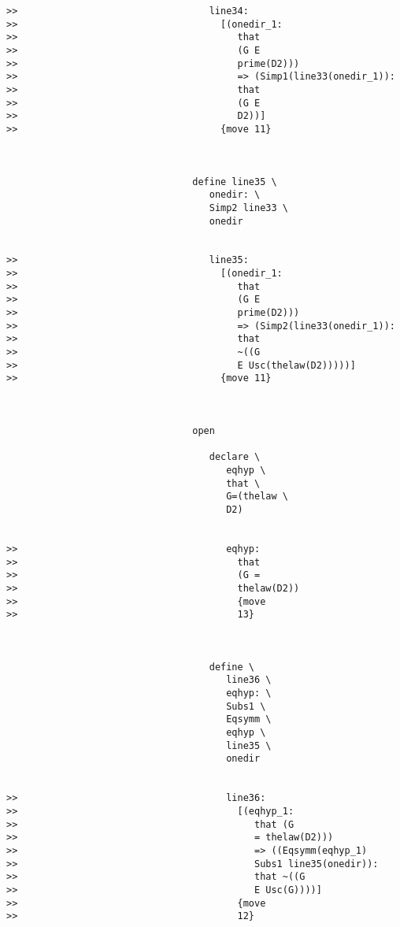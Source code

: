 \documentclass[12pt]{article}
\begin{document}
\begin{verbatim}
>>                                  line34:
>>                                    [(onedir_1:
>>                                       that
>>                                       (G E
>>                                       prime(D2)))
>>                                       => (Simp1(line33(onedir_1)):
>>                                       that
>>                                       (G E
>>                                       D2))]
>>                                    {move 11}



                                 define line35 \
                                    onedir: \
                                    Simp2 line33 \
                                    onedir


>>                                  line35:
>>                                    [(onedir_1:
>>                                       that
>>                                       (G E
>>                                       prime(D2)))
>>                                       => (Simp2(line33(onedir_1)):
>>                                       that
>>                                       ~((G
>>                                       E Usc(thelaw(D2)))))]
>>                                    {move 11}



                                 open

                                    declare \
                                       eqhyp \
                                       that \
                                       G=(thelaw \
                                       D2)


>>                                     eqhyp:
>>                                       that
>>                                       (G =
>>                                       thelaw(D2))
>>                                       {move
>>                                       13}



                                    define \
                                       line36 \
                                       eqhyp: \
                                       Subs1 \
                                       Eqsymm \
                                       eqhyp \
                                       line35 \
                                       onedir


>>                                     line36:
>>                                       [(eqhyp_1:
>>                                          that (G
>>                                          = thelaw(D2)))
>>                                          => ((Eqsymm(eqhyp_1)
>>                                          Subs1 line35(onedir)):
>>                                          that ~((G
>>                                          E Usc(G))))]
>>                                       {move
>>                                       12}




\end{verbatim}
\end{document}
